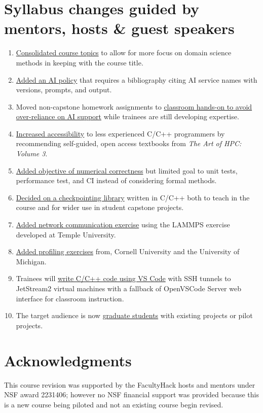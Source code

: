 \documentclass[
portrait,
custom
]{sciposter}
\begin{document}
\begin{multicols}{2}
  \section*{Syllabus changes guided by mentors, hosts \& guest speakers}
  \begin{multicols}{2}
    \begin{enumerate}
    \item \ul{Consolidated course topics} %
      to allow for more focus on domain science methods %
      in keeping with the course title.
    \item \ul{Added an AI policy} %
      that requires a bibliography %
      citing AI service names with versions, prompts, and output.
    \item Moved non-capstone homework assignments to %
      \ul{classroom hands-on to avoid over-reliance on AI support} %
      while trainees are still developing expertise.
    \item \ul{Increased accessibility} %
      to less experienced C/C++ programmers %
      by recommending self-guided, open access textbooks %
      from \emph{The Art of HPC: Volume 3}.
    \item \ul{Added objective of numerical correctness} %
      but limited goal to unit tests, performance test, and CI %
      instead of considering formal methods.
    \item \ul{Decided on a checkpointing library} %
      written in C/C++ %
      both to teach in the course %
      and for wider use in student capstone projects.
    \item \ul{Added network communication exercise} %
      using the LAMMPS exercise developed at Temple University.
    \item \ul{Added profiling exercises} %
      from, Cornell University %
      and the University of Michigan.
    \item Trainees will \ul{write C/C++ code using VS Code} %
      with SSH tunnels to JetStream2 virtual machines %
      with a fallback of OpenVSCode Server web interface %
      for classroom instruction.
    \item The target audience is now \ul{graduate students} %
      with existing projects or pilot projects.
    \end{enumerate}
  \end{multicols}

  \section*{Acknowledgments}
  This course revision was supported %
  by the FacultyHack hosts and mentors %
  under NSF award 2231406; %
  however no NSF financial support was provided %
  because this is a new course being piloted %
  and not an existing course begin revised.
  \medskip


\end{multicols}
\end{document}
